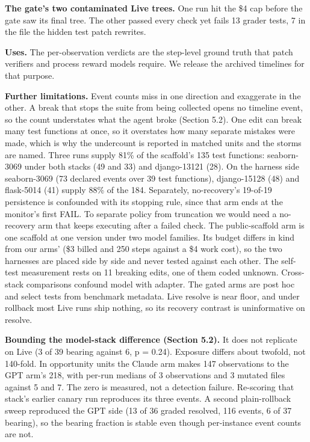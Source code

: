 \documentclass{article}
\begin{document}
\textbf{The gate's two contaminated Live trees.} One run hit the \$4 cap before the gate saw its final tree. The other passed every check yet fails 13 grader tests, 7 in the file the hidden test patch rewrites.

\textbf{Uses.} The per-observation verdicts are the step-level ground truth that patch verifiers \cite{ref24} and process reward models \cite{ref25} require. We release the archived timelines for that purpose.

\textbf{Further limitations.} Event counts miss in one direction and exaggerate in the other. A break that stops the suite from being collected opens no timeline event, so the count understates what the agent broke (Section 5.2). One edit can break many test functions at once, so it overstates how many separate mistakes were made, which is why the undercount is reported in matched units and the storms are named. Three runs supply 81\% of the scaffold's 135 test functions: seaborn-3069 under both stacks (49 and 33) and django-13121 (28). On the harness side seaborn-3069 (73 declared events over 39 test functions), django-15128 (48) and flask-5014 (41) supply 88\% of the 184. Separately, no-recovery's 19-of-19 persistence is confounded with its stopping rule, since that arm ends at the monitor's first FAIL. To separate policy from truncation we would need a no-recovery arm that keeps executing after a failed check. The public-scaffold arm is one scaffold at one version under two model families. Its budget differs in kind from our arms' (\$3 billed and 250 steps against a \$4 work cost), so the two harnesses are placed side by side and never tested against each other. The self-test measurement rests on 11 breaking edits, one of them coded unknown. Cross-stack comparisons confound model with adapter. The gated arms are post hoc and select tests from benchmark metadata. Live resolve is near floor, and under rollback most Live runs ship nothing, so its recovery contrast is uninformative on resolve.

\textbf{Bounding the model-stack difference (Section 5.2).} It does not replicate on Live (3 of 39 bearing against 6, p = 0.24). Exposure differs about twofold, not 140-fold. In opportunity units the Claude arm makes 147 observations to the GPT arm's 218, with per-run medians of 3 observations and 3 mutated files against 5 and 7. The zero is measured, not a detection failure. Re-scoring that stack's earlier canary run reproduces its three events. A second plain-rollback sweep reproduced the GPT side (13 of 36 graded resolved, 116 events, 6 of 37 bearing), so the bearing fraction is stable even though per-instance event counts are not.
\end{document}
